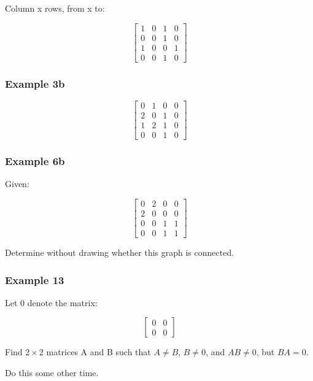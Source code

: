\documentclass{article}
\begin{document}
Column x rows, from x to:

\[
\begin{bmatrix}
1 & 0 & 1 & 0 \\
0 & 0 & 1 & 0 \\
1 & 0 & 0 & 1 \\
0 & 0 & 1 & 0
\end{bmatrix}
\]

\subsubsection{Example 3b}
\[
\begin{bmatrix}
0 & 1 & 0 & 0 \\
2 & 0 & 1 & 0 \\
1 & 2 & 1 & 0 \\
0 & 0 & 1 & 0
\end{bmatrix}
\]

\subsubsection{Example 6b}
Given:

\[
\begin{bmatrix}
0 & 2 & 0 & 0 \\
2 & 0 & 0 & 0 \\
0 & 0 & 1 & 1 \\
0 & 0 & 1 & 1
\end{bmatrix}
\]

Determine without drawing whether this graph is connected.


\subsubsection{Example 13}
Let 0 denote the matrix:

\[
\begin{bmatrix}
0 & 0 \\
0 & 0
\end{bmatrix}
\]

Find $2 \times 2$ matrices A and B such that $A \neq B$, $B \neq 0$, and $AB \neq 0$, but $BA = 0$.

Do this some other time.
\end{document}
